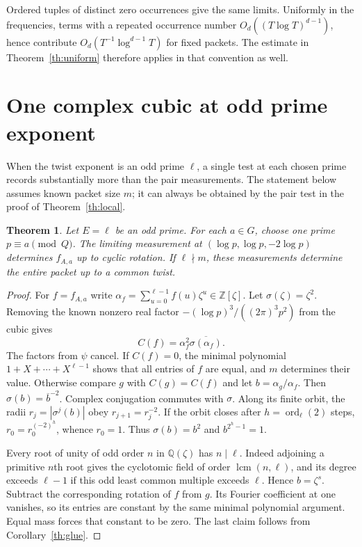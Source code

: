 \documentclass[11pt,letterpaper]{article}
\newtheorem{theorem}{Theorem}
\newcommand{\Z}{\mathbb Z}
\newcommand{\Q}{\mathbb Q}
\DeclareMathOperator{\ord}{ord}
\begin{document}
Ordered tuples of distinct zero occurrences give the same limits. Uniformly in the frequencies, terms with a repeated occurrence number $O_d((T\log T)^{d-1})$, hence contribute $O_d(T^{-1}\log^{d-1}T)$ for fixed packets. The estimate in Theorem~\ref{th:uniform} therefore applies in that convention as well.

\newpage
\section{One complex cubic at odd prime exponent}\label{sec:cubic}
When the twist exponent is an odd prime $\ell$, a single test at each chosen prime records substantially more than the pair measurements. The statement below assumes known packet size $m$; it can always be obtained by the pair test in the proof of Theorem~\ref{th:local}.
\begin{theorem}\label{th:cubic}
Let $E=\ell$ be an odd prime. For each $a\in G$, choose one prime $p\equiv a\pmod Q$. The limiting measurement at $(\log p,\log p,-2\log p)$ determines $f_{A,a}$ up to cyclic rotation. If $\ell\nmid m$, these measurements determine the entire packet up to a common twist.
\end{theorem}
\begin{proof}
For $f=f_{A,a}$ write $\alpha_f=\sum_{u=0}^{\ell-1} f(u)\zeta^u\in\Z[\zeta]$. Let $\sigma(\zeta)=\zeta^2$. Removing the known nonzero real factor $-(\log p)^3/((2\pi)^3p^2)$ from the cubic gives
\[
 C(f)=\alpha_f^2\overline{\sigma(\alpha_f)} .
\]
The factors from $\psi$ cancel. If $C(f)=0$, the minimal polynomial $1+X+\cdots+X^{\ell-1}$ shows that all entries of $f$ are equal, and $m$ determines their value. Otherwise compare $g$ with $C(g)=C(f)$ and let $b=\alpha_g/\alpha_f$. Then $\sigma(b)=\overline b^{-2}$. Complex conjugation commutes with $\sigma$. Along its finite orbit, the radii $r_j=|\sigma^j(b)|$ obey $r_{j+1}=r_j^{-2}$. If the orbit closes after $h=\ord_\ell(2)$ steps, $r_0=r_0^{(-2)^h}$, whence $r_0=1$. Thus $\sigma(b)=b^2$ and $b^{2^h-1}=1$.

Every root of unity of odd order $n$ in $\Q(\zeta)$ has $n\mid\ell$. Indeed adjoining a primitive $n$th root gives the cyclotomic field of order $\operatorname{lcm}(n,\ell)$, and its degree exceeds $\ell-1$ if this odd least common multiple exceeds $\ell$. Hence $b=\zeta^s$. Subtract the corresponding rotation of $f$ from $g$. Its Fourier coefficient at one vanishes, so its entries are constant by the same minimal polynomial argument. Equal mass forces that constant to be zero. The last claim follows from Corollary~\ref{th:glue}.
\end{proof}
\end{document}
